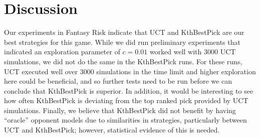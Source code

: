 \documentclass[letterpaper]{article}
\numberwithin{equation}{section}
\numberwithin{theorem}{section}
\numberwithin{lemma}{section}
\numberwithin{df}{section}
\begin{document}
%
%

\section{Discussion}


Our experiments in Fantasy Risk indicate that UCT and KthBestPick are our best strategies for this game.  While we did run preliminary experiments that indicated an exploration parameter of $c = 0.01$ worked well with 3000 UCT simulations, we did not do the same in the KthBestPick runs.  For these runs, UCT executed well over $3000$ simulations in the time limit and higher exploration here could be beneficial, and so further tests need to be run before we can conclude that KthBestPick is superior.  In addition, it would be interesting to see how often KthBestPick is deviating from the top ranked pick provided by UCT simulations.  Finally, we believe that KthBestPick did not benefit by having ``oracle'' opponent models due to similarities in strategies, particularly between UCT and KthBestPick; however, statistical evidence of this is needed.
\end{document}
